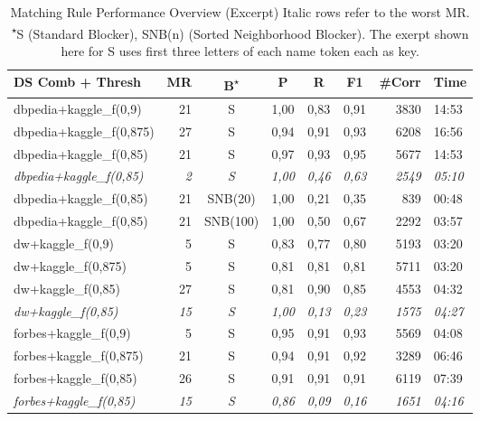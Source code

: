 \documentclass[11pt,titlepage,oneside,openany]{book}
\begin{document}
\begin{table}[]
	\small
	\begin{tabular}{lrccccrl}
		DS Comb + Thresh                 & MR          & B\textsuperscript{$\star$}          & P             & R             & F1            & \#Corr        & Time           \\\hline
		dbpedia+kaggle\_f(0,9)           & 21          & S          & 1,00          & 0,83          & 0,91          & 3830          & 14:53          \\
		dbpedia+kaggle\_f(0,875)         & 27          & S          & 0,94          & 0,91          & 0,93          & 6208          & 16:56          \\
		dbpedia+kaggle\_f(0,85)          & 21          & S          & 0,97          & 0,93          & 0,95          & 5677          & 14:53          \\
		\textit{dbpedia+kaggle\_f(0,85)} & \textit{2}  & \textit{S} & \textit{1,00} & \textit{0,46} & \textit{0,63} & \textit{2549} & \textit{05:10} \\
		dbpedia+kaggle\_f(0,85)          & 21          & SNB(20)    & 1,00          & 0,21          & 0,35          & 839           & 00:48          \\
		dbpedia+kaggle\_f(0,85)          & 21          & SNB(100)   & 1,00          & 0,50          & 0,67          & 2292          & 03:57          \\
		dw+kaggle\_f(0,9)                & 5           & S          & 0,83          & 0,77          & 0,80          & 5193          & 03:20          \\
		dw+kaggle\_f(0,875)              & 5           & S          & 0,81          & 0,81          & 0,81          & 5711          & 03:20          \\
		dw+kaggle\_f(0,85)               & 27          & S          & 0,81          & 0,90          & 0,85          & 4553          & 04:32          \\
		\textit{dw+kaggle\_f(0,85)}      & \textit{15} & \textit{S} & \textit{1,00} & \textit{0,13} & \textit{0,23} & \textit{1575} & \textit{04:27} \\
		forbes+kaggle\_f(0,9)            & 5           & S          & 0,95          & 0,91          & 0,93          & 5569          & 04:08          \\
		forbes+kaggle\_f(0,875)          & 21          & S          & 0,94          & 0,91          & 0,92          & 3289          & 06:46          \\
		forbes+kaggle\_f(0,85)           & 26          & S          & 0,91          & 0,91          & 0,91          & 6119          & 07:39          \\
		\textit{forbes+kaggle\_f(0,85)}  & \textit{15} & \textit{S} & \textit{0,86} & \textit{0,09} & \textit{0,16} & \textit{1651} & \textit{04:16}
	\end{tabular}
\caption[Matching Rule Performance Overview (Excerpt)]{Matching Rule Performance Overview (Excerpt) \medspace\small Italic rows refer to the worst MR. \textsuperscript{$\star$}S (Standard Blocker), SNB(n) (Sorted Neighborhood Blocker). The exerpt shown here for S uses first three letters of each name token each as key.}
\label{tab:mr-performance}


\end{table}
\end{document}
